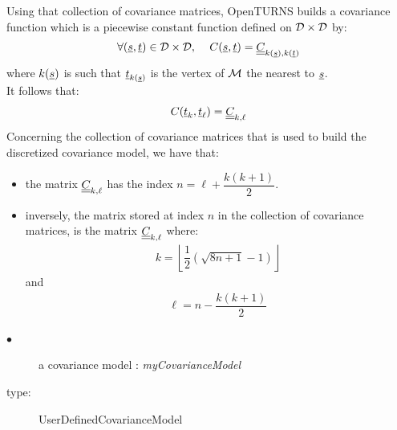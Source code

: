 Using that collection of covariance matrices, OpenTURNS builds a covariance function which is a  piecewise constant function defined on ${\mathcal D} \times {\mathcal D}$ by:
\begin{align*}
  \forall ({\underline{s}}, {\underline{t}}) \in {\mathcal D} \times {\mathcal D}, \, \quad C({\underline{s}}, {\underline{t}}) =  {\underline{\underline{C}}}_{k({\underline{s}}),k({\underline{t}})}
\end{align*}
where $k({\underline{s}})$ is such that ${\underline{t}}_{k({\underline{s}})}$ is the  vertex of ${\mathcal M}$ the nearest to ${\underline{s}}$.\\
It follows that:
\begin{align*}
  C({\underline{t}}_k, {\underline{t}}_\ell) = {\underline{\underline{C}}}_{k,\ell}
\end{align*}
Concerning the  collection of covariance matrices that is used to build the discretized covariance model, we have that:
\begin{itemize}
\item the  matrix ${\underline{\underline{C}}}_{k,\ell}$ has the index $n=\ell +\dfrac{k(k+1)}{2}$.
\item inversely, the matrix stored at index $n$ in the collection of covariance matrices, is the matrix ${\underline{\underline{C}}}_{k,\ell}$ where:
  \begin{align*}
    k=\left\lfloor \dfrac{1}{2}\left( \sqrt{8n+1}-1 \right) \right\rfloor
  \end{align*}
  and
  \begin{align*}
    \ell= n-\dfrac{k(k+1)}{2}
  \end{align*}
\end{itemize}




{
  \begin{description}
  \item[$\bullet$] a covariance model : {\itshape myCovarianceModel}
  \item[type:] UserDefinedCovarianceModel
  \end{description}

}

